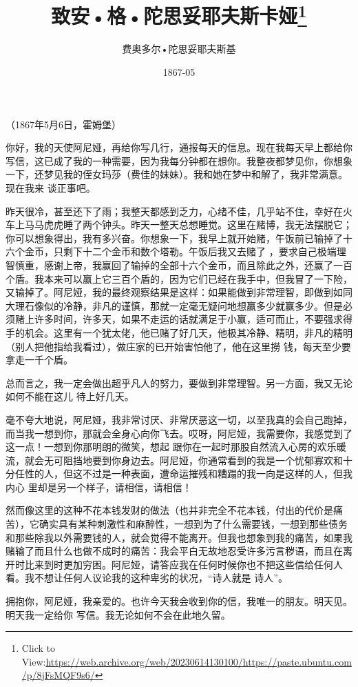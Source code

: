 \documentclass{article}
\title{致安•格•陀思妥耶夫斯卡娅\footnote{Click to View:\url{https://web.archive.org/web/20230614130100/https://paste.ubuntu.com/p/8jFsMQF9s6/}}}
\author{费奥多尔•陀思妥耶夫斯基}
\date{1867-05}
\begin{document}

\maketitle


\Large


﻿（1867年5月6日，霍姆堡） 

你好，我的天使阿尼娅，再给你写几行，通报每天的信息。现在我每天早上都给你写信，这已成了我的一种需要，因为我每分钟都在想你。我整夜都梦见你，你想象一下，还梦见我的侄女玛莎（费佳的妹妹）。我和她在梦中和解了，我非常满意。现在我来
谈正事吧。 

昨天很冷，甚至还下了雨；我整天都感到乏力，心绪不佳，几乎站不住，幸好在火车上马马虎虎睡了两个钟头。昨天一整天总想睡觉。这里在赌博，我无法摆脱它；你可以想象得出，我有多兴奋。你想象一下，我早上就开始赌，午饭前已输掉了十六个金币，只剩下十二个金币和数个塔勒。午饭后我又去赌了
\newpage
，要求自己极端理智慎重，感谢上帝，我赢回了输掉的全部十六个金币，而且除此之外，还赢了一百个盾。我本来可以赢上它三百个盾的，因为它们已经在我手中，但我冒了一下险，又输掉了。阿尼娅，我的最终观察结果是这样：如果能做到非常理智，即做到如同大理石像似的冷静，非凡的谨慎，那就一定毫无疑问地想赢多少就赢多少。但是必须赌上许多时间，许多天，如果不走运的话就满足于小赢，适可而止，不要强求得手的机会。这里有一个犹太佬，他已赌了好几天，他极其冷静、精明，非凡的精明（别人把他指给我看过），做庄家的已开始害怕他了，他在这里撈
钱，每天至少要拿走一千个盾。 

总而言之，我一定会做出超乎凡人的努力，要做到非常理智。另一方面，我又无论如何不能在这儿
待上好几天。 

毫不夸大地说，阿尼娅，我非常讨厌、非常厌恶这一切，以至我真的会自己跑掉，而当我一想到你，那就会全身心向你飞去。哎呀，阿尼娅，我需要你，我感觉到了这一点！一想到你那明朗的微笑，想起
\newpage
跟你在一起时那股自然流入心房的欢乐暖流，就会无可阻挡地要到你身边去。阿尼娅，你通常看到的我是一个忧郁寡欢和十分任性的人，但这不过是一种表面，遭命运摧残和糟蹋的我一向是这样的人，但我内心
里却是另一个样子，请相信，请相信！ 

然而像这里的这种不花本钱发财的做法（也并非完全不花本钱，付出的代价是痛苦），它确实具有某种刺激性和麻醉性，一想到为了什么需要钱，一想到那些债务和那些除我以外需要钱的人，就会觉得不能离开。但我也想象到我的痛苦，如果我赌输了而且什么也做不成时的痛苦：我会平白无故地忍受许多污言秽语，而且在离开时比来到时更加穷困。阿尼娅，请答应我在任何时候你也不把这些信给任何人看。我不想让任何人议论我的这种卑劣的状况，“诗人就是
诗人”。 

拥抱你，阿尼娅，我亲爱的。也许今天我会收到你的信，我唯一的朋友。明天见。明天我一定给你
写信。我无论如何不会在此地久留。 
\end{document}
